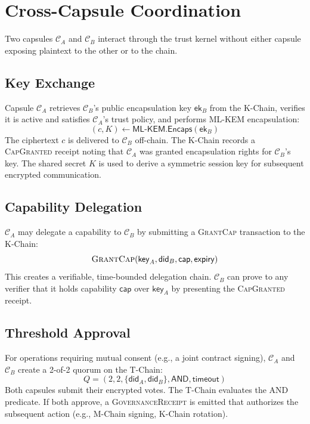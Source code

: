 \documentclass[11pt,a4paper]{article}
\begin{document}
\section{Cross-Capsule Coordination}\label{sec:cross-capsule}

Two capsules $\mathcal{C}_A$ and $\mathcal{C}_B$ interact through the trust
kernel without either capsule exposing plaintext to the other or to the chain.

\subsection{Key Exchange}

Capsule $\mathcal{C}_A$ retrieves $\mathcal{C}_B$'s public encapsulation key
$\mathsf{ek}_B$ from the K-Chain, verifies it is active and satisfies
$\mathcal{C}_A$'s trust policy, and performs ML-KEM encapsulation:
\[
    (c, K) \gets \mathsf{ML\text{-}KEM.Encaps}(\mathsf{ek}_B)
\]
The ciphertext $c$ is delivered to $\mathcal{C}_B$ off-chain. The K-Chain
records a \textsc{CapGranted} receipt noting that $\mathcal{C}_A$ was granted
encapsulation rights for $\mathcal{C}_B$'s key. The shared secret $K$ is used
to derive a symmetric session key for subsequent encrypted communication.

\subsection{Capability Delegation}

$\mathcal{C}_A$ may delegate a capability to $\mathcal{C}_B$ by submitting a
\textsc{GrantCap} transaction to the K-Chain:
\[
    \textsc{GrantCap}(\mathsf{key}_A, \mathsf{did}_B, \mathsf{cap}, \mathsf{expiry})
\]
This creates a verifiable, time-bounded delegation chain. $\mathcal{C}_B$ can
prove to any verifier that it holds capability $\mathsf{cap}$ over
$\mathsf{key}_A$ by presenting the \textsc{CapGranted} receipt.

\subsection{Threshold Approval}

For operations requiring mutual consent (e.g., a joint contract signing),
$\mathcal{C}_A$ and $\mathcal{C}_B$ create a 2-of-2 quorum on the T-Chain:
\[
    Q = (2, 2, \{\mathsf{did}_A, \mathsf{did}_B\}, \mathsf{AND}, \mathsf{timeout})
\]
Both capsules submit their encrypted votes. The T-Chain evaluates the AND
predicate. If both approve, a \textsc{GovernanceReceipt} is emitted that
authorizes the subsequent action (e.g., M-Chain signing, K-Chain rotation).
\end{document}

